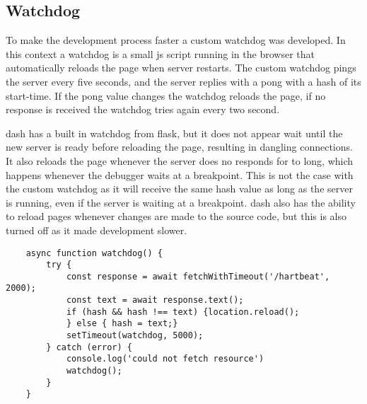\subsection{Watchdog}
To make the development process faster a custom watchdog was developed.
In this context a watchdog is a small \gls{js} script running in the browser that automatically reloads the page when server restarts.
The custom watchdog pings the server every five seconds, and the server replies with a pong with a hash of its start-time.
If the pong value changes the watchdog reloads the page, if no response is received the watchdog tries again every two second.

\gls{dash} has a built in watchdog from \gls{flask}, but it does not appear wait until the new server is ready before reloading the page, resulting in dangling connections.
It also reloads the page whenever the server does no responds for to long, which happens whenever the debugger waits at a breakpoint.
This is not the case with the custom watchdog as it will receive the same hash value as long as the server is running, even if the server is waiting at a breakpoint.
\gls{dash} also has the ability to reload pages whenever changes are made to the source code, but this is also turned off as it made development slower.


\begin{listing}[H]
    \begin{verbatim}
    async function watchdog() {
        try {
            const response = await fetchWithTimeout('/hartbeat', 2000);
            const text = await response.text();
            if (hash && hash !== text) {location.reload();
            } else { hash = text;}
            setTimeout(watchdog, 5000);
        } catch (error) {
            console.log('could not fetch resource')
            watchdog();
        }
    }
    \end{verbatim}
\end{listing}